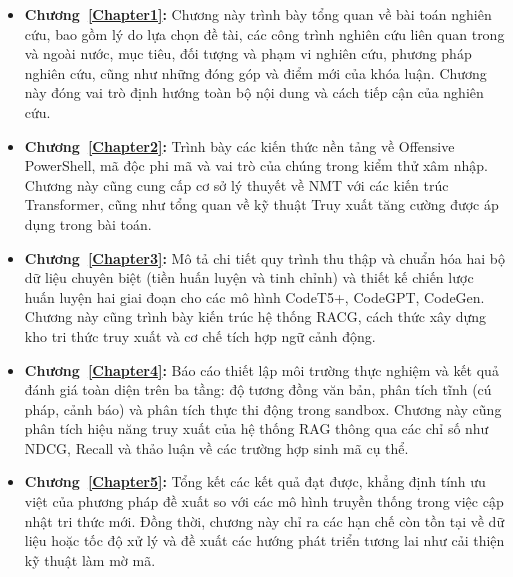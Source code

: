 \begin{itemize}

    \item \textbf{Chương~\ref{Chapter1}: }
    \newline
    Chương này trình bày tổng quan về bài toán nghiên cứu, bao gồm lý do lựa chọn đề tài, các công trình nghiên cứu liên quan trong và ngoài nước, mục tiêu, đối tượng và phạm vi nghiên cứu, phương pháp nghiên cứu, cũng như những đóng góp và điểm mới của khóa luận. Chương này đóng vai trò định hướng toàn bộ nội dung và cách tiếp cận của nghiên cứu.

    \item \textbf{Chương~\ref{Chapter2}: }  
    \newline
    Trình bày các kiến thức nền tảng về Offensive PowerShell, mã độc phi mã và vai trò của chúng trong kiểm thử xâm nhập. Chương này cũng cung cấp cơ sở lý thuyết về NMT với các kiến trúc Transformer, cũng như tổng quan về kỹ thuật Truy xuất tăng cường được áp dụng trong bài toán.

    \item \textbf{Chương~\ref{Chapter3}: }  
    \newline
    Mô tả chi tiết quy trình thu thập và chuẩn hóa hai bộ dữ liệu chuyên biệt (tiền huấn luyện và tinh chỉnh) và thiết kế chiến lược huấn luyện hai giai đoạn cho các mô hình CodeT5+, CodeGPT, CodeGen. Chương này cũng trình bày kiến trúc hệ thống RACG, cách thức xây dựng kho tri thức truy xuất và cơ chế tích hợp ngữ cảnh động.

    \item \textbf{Chương~\ref{Chapter4}: }  
    \newline
    Báo cáo thiết lập môi trường thực nghiệm và kết quả đánh giá toàn diện trên ba tầng: độ tương đồng văn bản, phân tích tĩnh (cú pháp, cảnh báo) và phân tích thực thi động trong sandbox. Chương này cũng phân tích hiệu năng truy xuất của hệ thống RAG thông qua các chỉ số như NDCG, Recall và thảo luận về các trường hợp sinh mã cụ thể.

    \item \textbf{Chương~\ref{Chapter5}: }  
    \newline
    Tổng kết các kết quả đạt được, khẳng định tính ưu việt của phương pháp đề xuất so với các mô hình truyền thống trong việc cập nhật tri thức mới. Đồng thời, chương này chỉ ra các hạn chế còn tồn tại về dữ liệu hoặc tốc độ xử lý và đề xuất các hướng phát triển tương lai như cải thiện kỹ thuật làm mờ mã.

\end{itemize}






